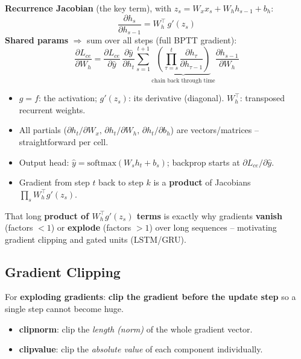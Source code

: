 \documentclass[10pt,a4paper]{article}
\begin{document}
	\begin{formulabox}
		\textbf{Recurrence Jacobian} (the key term), with $z_s = W_x x_s + W_h h_{s-1} + b_h$:
		\[
		\frac{\partial h_s}{\partial h_{s-1}} = W_h^\top \, g'(z_s)
		\]
		\textbf{Shared params} $\Rightarrow$ sum over all steps (full BPTT gradient):
		\[
		\frac{\partial L_{ce}}{\partial W_h}
		= \frac{\partial L_{ce}}{\partial \hat y}\,\frac{\partial \hat y}{\partial h_t}
		\sum_{s=1}^{t+1}\underbrace{\left(\prod_{\tau=s}^{t}\frac{\partial h_\tau}{\partial h_{\tau-1}}\right)}_{\text{chain back through time}}\frac{\partial h_{s-1}}{\partial W_h}
		\]
	\end{formulabox}
	\begin{itemize}[leftmargin=*]
		\item $g = f$: the activation; $g'(z_s)$: its derivative (diagonal). \; $W_h^\top$: transposed recurrent weights.
		\item All partials ($\partial h_t/\partial W_x,\,\partial h_t/\partial W_h,\,\partial h_t/\partial b_h$) are vectors/matrices -- straightforward per cell.
		\item Output head: $\hat y = \mathrm{softmax}(W_s h_t + b_s)$; backprop starts at $\partial L_{ce}/\partial \hat y$.
		\item Gradient from step $t$ back to step $k$ is a \textbf{product} of Jacobians $\prod_{s} W_h^\top g'(z_s)$.
	\end{itemize}

	\begin{importantbox}
		That long \textbf{product of $W_h^\top g'(z_s)$ terms} is exactly why gradients \textbf{vanish} (factors $<1$) or \textbf{explode} (factors $>1$) over long sequences -- motivating gradient clipping and gated units (LSTM/GRU).
	\end{importantbox}

	\subsection{Gradient Clipping}

	\begin{definitionbox}
		For \textbf{exploding gradients}: \textbf{clip the gradient before the update step} so a single step cannot become huge.
	\end{definitionbox}

	\begin{itemize}[leftmargin=*]
		\item \textbf{clipnorm}: clip the \emph{length (norm)} of the whole gradient vector.
		\item \textbf{clipvalue}: clip the \emph{absolute value} of each component individually.
	\end{itemize}
\end{document}
